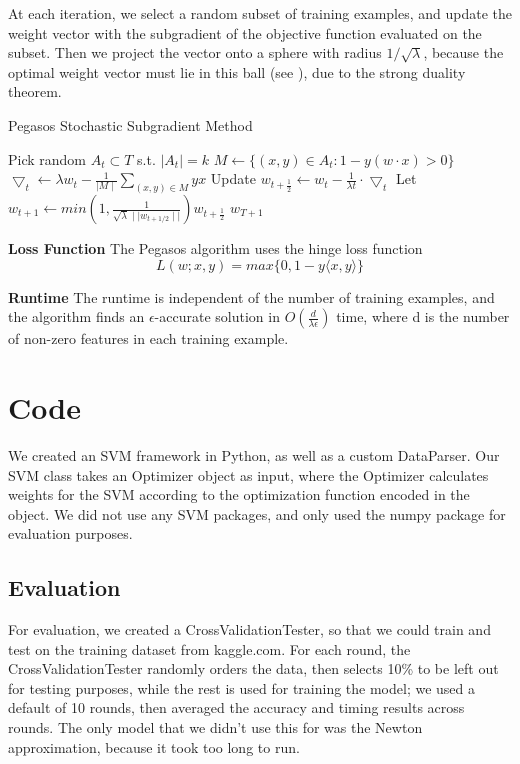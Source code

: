 \documentclass[letterpaper, 11pt]{article}
\begin{document}
At each iteration, we select a random subset of training examples, and update the weight vector with the subgradient of the objective function evaluated on the subset.  Then we project the vector onto a sphere with radius $1/\sqrt{\lambda}$, because the optimal weight vector must lie in this ball (see \citeauthor{menon}), due to the strong duality theorem.

\begin{algorithm}
\caption{Pegasos Stochastic Subgradient Method}
\begin{algorithmic}
		\STATE Pick random $A_t \subset T$ s.t. $\mid A_t \mid = k$
		\STATE$ M \leftarrow \{ (x,y) \in A_t: 1-y(w\cdot x) >0 \}$
		\STATE $\bigtriangledown_t \leftarrow \lambda w_t - \frac{1}{\mid M \mid} \sum_{(x,y) \in M} yx$
		\STATE Update $w_{t+\frac{1}{2}} \leftarrow w_t - \frac{1}{\lambda t}\cdot\bigtriangledown_t$
		\STATE Let $w_{t+1} \leftarrow min \left( 1, \frac{1}{\sqrt{\lambda} \mid \mid w_{t+1/2} \mid \mid} \right) w_{t+\frac{1}{2}}$
	\ENDFOR
	\RETURN $w_{T+1}$
\end{algorithmic}
\end{algorithm}

\textbf{Loss Function} The Pegasos algorithm uses the hinge loss function $$ L(w; x,y) = max\{0, 1-y\langle x, y\rangle\} $$

\textbf{Runtime} The runtime is independent of the number of training examples, and the algorithm finds an $\epsilon$-accurate solution in $O(\frac{d}{\lambda \epsilon})$ time, where d is the number of non-zero features in each training example.


\section{Code}
We created an SVM framework in Python, as well as a custom DataParser.  Our SVM class takes an Optimizer object as input, where the Optimizer calculates weights for the SVM according to the optimization function encoded in the object.   We did not use any SVM packages, and only used the numpy package for evaluation purposes.

\subsection{Evaluation}
For evaluation, we created a CrossValidationTester, so that we could train and test on the training dataset from kaggle.com.  For each round, the CrossValidationTester randomly orders the data, then selects 10\% to be left out for testing purposes, while the rest is used for training the model; we used a default of 10 rounds, then averaged the accuracy and timing results across rounds.  The only model that we didn't use this for was the Newton approximation, because it took too long to run.
\end{document}
